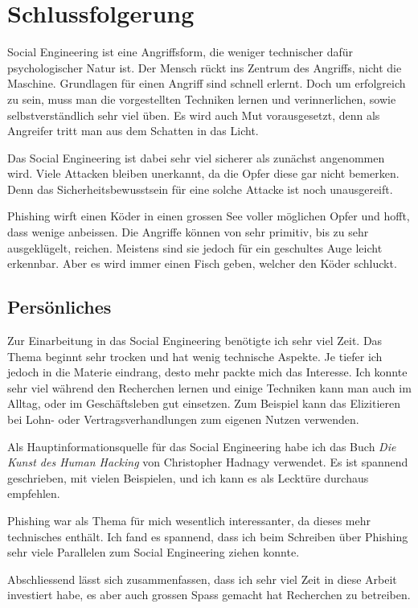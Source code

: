 \chapter{Schlussfolgerung}

Social Engineering ist eine Angriffsform, die weniger technischer dafür psychologischer Natur ist. Der Mensch rückt ins Zentrum des Angriffs, nicht die Maschine. Grundlagen für einen Angriff sind schnell erlernt. Doch um erfolgreich zu sein, muss man die vorgestellten Techniken lernen und verinnerlichen, sowie selbstverständlich sehr viel üben. Es wird auch Mut vorausgesetzt, denn als Angreifer tritt man aus dem Schatten in das Licht. 

Das Social Engineering ist dabei sehr viel sicherer als zunächst angenommen wird. Viele Attacken bleiben unerkannt, da die Opfer diese gar nicht bemerken. Denn das Sicherheitsbewusstsein für eine solche Attacke ist noch unausgereift.

Phishing wirft einen Köder in einen grossen See voller möglichen Opfer und hofft, dass wenige anbeissen. Die Angriffe können von sehr primitiv, bis zu sehr ausgeklügelt, reichen. Meistens sind sie jedoch für ein geschultes Auge leicht erkennbar. Aber es wird immer einen Fisch geben, welcher den Köder schluckt.

\section{Persönliches}
Zur Einarbeitung in das Social Engineering benötigte ich sehr viel Zeit. Das Thema beginnt sehr trocken und hat wenig technische Aspekte. Je tiefer ich jedoch in die Materie eindrang, desto mehr packte mich das Interesse. Ich konnte sehr viel während den Recherchen lernen und einige Techniken kann man auch im Alltag, oder im Geschäftsleben gut einsetzen. Zum Beispiel kann das Elizitieren bei Lohn- oder Vertragsverhandlungen zum eigenen Nutzen verwenden.

Als Hauptinformationsquelle für das Social Engineering habe ich das Buch \textit{Die Kunst des Human Hacking} von Christopher Hadnagy verwendet. Es ist spannend geschrieben, mit vielen Beispielen, und ich kann es als Lecktüre durchaus empfehlen.

Phishing war als Thema für mich wesentlich interessanter, da dieses mehr technisches enthält. Ich fand es spannend, dass ich beim Schreiben über Phishing sehr viele Parallelen zum Social Engineering ziehen konnte.

Abschliessend lässt sich zusammenfassen, dass ich sehr viel Zeit in diese Arbeit investiert habe, es aber auch grossen Spass gemacht hat Recherchen zu betreiben.



\glsaddall
